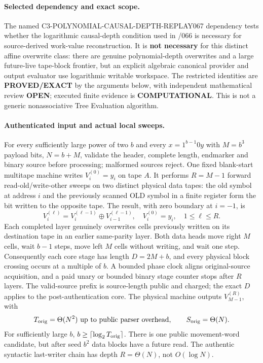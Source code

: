 \documentclass[11pt]{article}
\begin{document}
\paragraph{Selected dependency and exact scope.}
The named \textsf{C3-POLYNOMIAL-CAUSAL-DEPTH-REPLAY067}
dependency tests whether the logarithmic causal-depth condition used
in /066 is necessary for source-derived work-value reconstruction.
It is \textbf{not necessary} for this distinct affine overwrite class:
there are genuine polynomial-depth overwrites and a large
future-live tape-block frontier, but an explicit algebraic canonical
provider and output evaluator use logarithmic writable workspace.
The restricted identities are \textbf{PROVED/EXACT} by the arguments
below, with independent mathematical review \textbf{OPEN};
executed finite evidence is \textbf{COMPUTATIONAL}.
This is not a generic nonassociative Tree Evaluation algorithm.

\paragraph{Authenticated input and actual local sweeps.}
For every sufficiently large power of two $b$ and every
$x=1^{b-1}0y$ with $M=b^3$ payload bits, $N=b+M$, validate the
header, complete length, endmarker and binary source before processing;
malformed sources reject. One fixed blank-start multitape machine
writes $V^{(0)}_i=y_i$ on tape $A$. It performs $R=M-1$ forward
read-old/write-other sweeps on two distinct physical data tapes:
the old symbol at address $i$ and the previously scanned OLD symbol
in a finite register form the bit written to the opposite tape.
The result, with zero boundary at $i=-1$, is
\[
 V^{(\ell)}_i=V^{(\ell-1)}_i\oplus
 V^{(\ell-1)}_{i-1},\quad
 V^{(0)}_i=y_i,\quad 1\le\ell\le R.
\]
Each completed layer genuinely overwrites cells previously written
on its destination tape in an earlier same-parity layer.
Both data heads move right $M$ cells, wait $b-1$ steps,
move left $M$ cells without writing, and wait one step.
Consequently each core stage has length $D=2M+b$, and every
physical block crossing occurs at a multiple of $b$.
A bounded phase clock aligns original-source acquisition, and
a paid unary or bounded binary stage counter stops after $R$
layers. The valid-source prefix is source-length public and charged;
the exact $D$ applies to the post-authentication core. The
physical machine outputs $V^{(R)}_{M-1}$, with
\[
 T_{\rm orig}=\Theta(N^2)\ \text{up to public parser overhead},
 \qquad S_{\rm orig}=\Theta(N).
\]
For sufficiently large $b$, $b\ge\lceil\log_2T_{\rm orig}\rceil$.
There is one public movement-word candidate, but after seed
$b^2$ data blocks have a future read. The authentic syntactic
last-writer chain has depth $R=\Theta(N)$, not $O(\log N)$.
\end{document}
